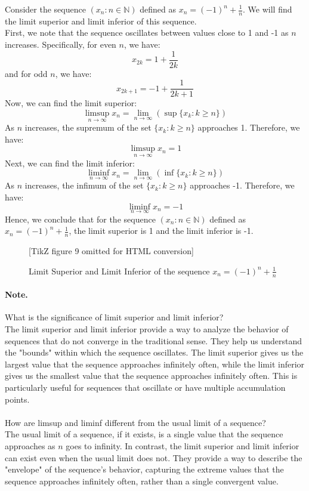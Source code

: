 \documentclass[openany]{book}
\numberwithin{equation}{section}
\begin{document}
    Consider the sequence $(x_n : n \in \mathbb{N})$ defined as $x_n = (-1)^n + \frac{1}{n}$. We will find the limit superior and limit inferior of this sequence. \\
    First, we note that the sequence oscillates between values close to 1 and -1 as $n$ increases. Specifically, for even $n$, we have:
    $$x_{2k} = 1 + \frac{1}{2k}$$
    and for odd $n$, we have:
    $$x_{2k+1} = -1 + \frac{1}{2k+1}$$
    Now, we can find the limit superior:
    $$\limsup_{n \to \infty} x_n = \lim_{n \to \infty} (\sup\{x_k : k \geq n\})$$
    As $n$ increases, the supremum of the set $\{x_k : k \geq n\}$ approaches 1. Therefore, we have:
    $$\limsup_{n \to \infty} x_n = 1$$
    Next, we can find the limit inferior:
    $$\liminf_{n \to \infty} x_n = \lim_{n \to \infty} (\inf\{x_k : k \geq n\})$$
    As $n$ increases, the infimum of the set $\{x_k : k \geq n\}$ approaches -1. Therefore, we have:
    $$\liminf_{n \to \infty} x_n = -1$$
    Hence, we conclude that for the sequence $(x_n : n \in \mathbb{N})$ defined as $x_n = (-1)^n + \frac{1}{n}$, the limit superior is 1 and the limit inferior is -1.
\par
\begin{figure}[H]
    \centering
    

[TikZ figure 9 omitted for HTML conversion]

    \caption{Limit Superior and Limit Inferior of the sequence $x_n = (-1)^n + \frac{1}{n}$}
\end{figure}
\paragraph{Note.}

    What is the significance of limit superior and limit inferior? \\
    The limit superior and limit inferior provide a way to analyze the behavior of sequences that do not converge in the traditional sense. They help us understand the "bounds" within which the sequence oscillates. The limit superior gives us the largest value that the sequence approaches infinitely often, while the limit inferior gives us the smallest value that the sequence approaches infinitely often. This is particularly useful for sequences that oscillate or have multiple accumulation points. \\ \\
    How are limsup and liminf different from the usual limit of a sequence? \\
    The usual limit of a sequence, if it exists, is a single value that the sequence approaches as $n$ goes to infinity. In contrast, the limit superior and limit inferior can exist even when the usual limit does not. They provide a way to describe the "envelope" of the sequence's behavior, capturing the extreme values that the sequence approaches infinitely often, rather than a single convergent value.
\par
\end{document}

